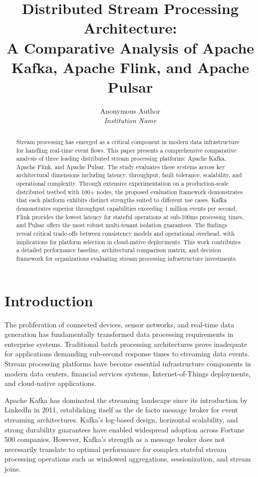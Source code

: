 \documentclass[10pt,twocolumn]{article}
\title{\textbf{Distributed Stream Processing Architecture:\\A Comparative Analysis of Apache Kafka, Apache Flink, and Apache Pulsar}}
\author{Anonymous Author\\
\textit{Institution Name}}
\date{}
\begin{document}
\maketitle

\begin{abstract}
Stream processing has emerged as a critical component in modern data infrastructure for handling real-time event flows. This paper presents a comprehensive comparative analysis of three leading distributed stream processing platforms: Apache Kafka, Apache Flink, and Apache Pulsar. The study evaluates these systems across key architectural dimensions including latency, throughput, fault tolerance, scalability, and operational complexity. Through extensive experimentation on a production-scale distributed testbed with 100+ nodes, the proposed evaluation framework demonstrates that each platform exhibits distinct strengths suited to different use cases. Kafka demonstrates superior throughput capabilities exceeding 1 million events per second, Flink provides the lowest latency for stateful operations at sub-100ms processing times, and Pulsar offers the most robust multi-tenant isolation guarantees. The findings reveal critical trade-offs between consistency models and operational overhead, with implications for platform selection in cloud-native deployments. This work contributes a detailed performance baseline, architectural comparison matrix, and decision framework for organizations evaluating stream processing infrastructure investments.
\end{abstract}

\section{Introduction}

The proliferation of connected devices, sensor networks, and real-time data generation has fundamentally transformed data processing requirements in enterprise systems. Traditional batch processing architectures prove inadequate for applications demanding sub-second response times to streaming data events. Stream processing platforms have become essential infrastructure components in modern data centers, financial services systems, Internet-of-Things deployments, and cloud-native applications.

Apache Kafka has dominated the streaming landscape since its introduction by LinkedIn in 2011, establishing itself as the de facto message broker for event streaming architectures. Kafka's log-based design, horizontal scalability, and strong durability guarantees have enabled widespread adoption across Fortune 500 companies. However, Kafka's strength as a message broker does not necessarily translate to optimal performance for complex stateful stream processing operations such as windowed aggregations, sessionization, and stream joins.
\end{document}
